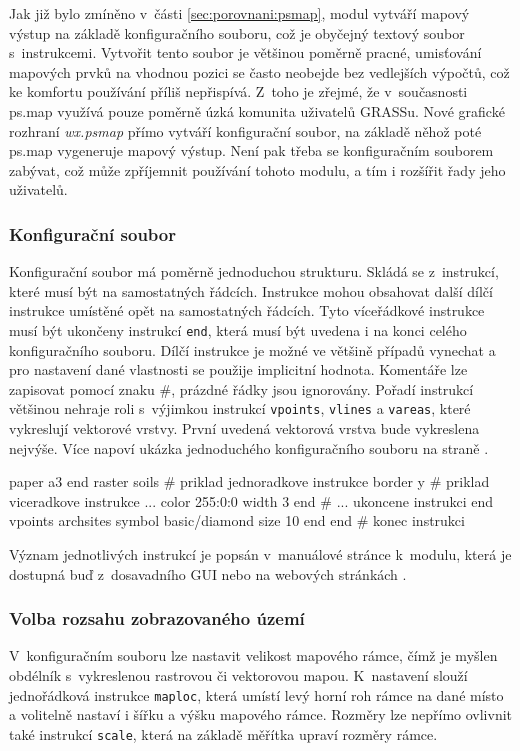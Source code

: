 \documentclass[a4paper,12pt,draft]{article}
\newcommand{\instr}[1]{\lstinline[style=psmapInline]|#1|}
\begin{document}
Jak již bylo zmíněno v~části \ref{sec:porovnani:psmap}, modul
vytváří
mapový výstup na základě konfiguračního souboru, což je oby\-čejný
textový soubor s~instrukcemi. Vytvořit tento soubor je většinou poměrně
pracné, umisťování mapových prvků na vhodnou pozici se často neobejde
bez vedlejších výpočtů, což ke komfortu používání příliš
nepřispívá. Z~toho je zřejmé, že v~součas\-nosti ps.map využívá
pouze poměrně úzká komunita uživatelů GRASSu. Nové grafické rozhraní
\emph{wx.psmap} přímo vytváří konfigurační soubor, na základě
něhož poté ps.map vygeneruje mapový výstup. Není pak třeba
se konfiguračním souborem zabývat, což může zpříjemnit používání
tohoto modulu, a tím i rozšířit řady jeho uživatelů.

\subsubsection{Konfigurační soubor}
Konfigurační soubor má poměrně jednoduchou strukturu. Skládá se
z~instrukcí, které musí být na samostatných řádcích. Instrukce mohou
obsahovat další dílčí instrukce umístěné opět na samostatných
řádcích. Tyto víceřádkové instrukce musí být ukončeny  instrukcí
\instr{end}, která musí být uvedena i na konci celého konfiguračního
souboru. Dílčí instrukce je možné ve většině případů vynechat a
pro nastavení dané vlastnosti se použije implicitní hodnota. Komentáře
lze zapisovat pomocí znaku \#, prázdné řádky jsou ignorovány. Pořadí
instrukcí většinou nehraje roli s~výjimkou instrukcí \instr{vpoints},
\instr{vlines} a \instr{vareas}, které vykreslují vektorové vrstvy. První
uvedená vektorová vrstva bude vykreslena nejvýše. Více napoví ukázka
jednoduchého konfiguračního souboru na straně \pageref{konfig}.
\begin{psmap}[float=h, title=Příklad jednoduchého konfiguračního souboru,
label=konfig]
paper a3
end
raster soils            # priklad jednoradkove instrukce
border y                # priklad viceradkove instrukce ...
   color 255:0:0
   width 3
end                     # ... ukoncene instrukci end
vpoints archsites
   symbol basic/diamond
   size 10
end
end                     # konec instrukci
\end{psmap}

Význam jednotlivých instrukcí je popsán v~manuálové stránce k~modulu,
která je dostupná buď z~dosavadního GUI nebo na webových stránkách
\cite{manual}.

\subsubsection{Volba rozsahu zobrazovaného území}
\label{sec:psmap:rozsah}
V~konfiguračním souboru lze nastavit velikost mapového rámce, čímž je
myšlen obdélník s~vykreslenou rastrovou či vektorovou mapou.  K~nastavení
slouží jedno\-řádková instrukce \instr{maploc}, která umístí levý
horní roh rámce na dané místo a volitelně nastaví i šířku a
výšku mapového rámce. Rozměry lze nepřímo ovlivnit také instrukcí
\instr{scale}, která na základě měřítka upraví rozměry rámce.
\end{document}
